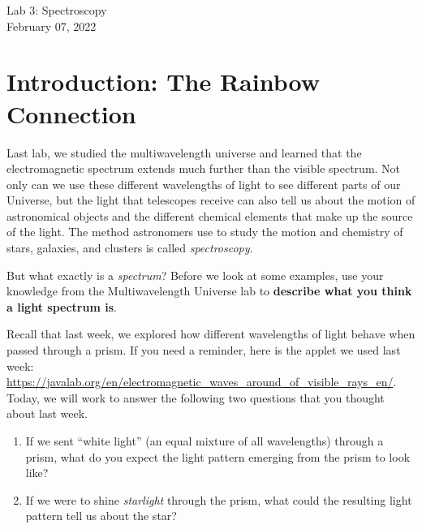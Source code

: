 \documentclass[11pt]{article}
\begin{document}
\begin{center}
\huge{Lab 3: Spectroscopy}\\ \medskip \Large{February 07, 2022}
\end{center}

\section{Introduction: The Rainbow Connection}
Last lab, we studied the multiwavelength universe and learned that the electromagnetic spectrum extends much further than the visible spectrum.  Not only can we use these different wavelengths of light to see different parts of our Universe, but the light that telescopes receive can also tell us about the motion of astronomical objects and the different chemical elements that make up the source of the light.  The method astronomers use to study the motion and chemistry of stars, galaxies, and clusters is called \textit{spectroscopy}.

\medskip \noindent
But what exactly is a \textit{spectrum}?  Before we look at some examples, use your knowledge from the Multiwavelength Universe lab to \textbf{describe what you think a light spectrum is}.

\medskip \noindent
Recall that last week, we explored how different wavelengths of light behave when passed through a prism. If you need a reminder, here is the applet we used last week: \url{https://javalab.org/en/electromagnetic_waves_around_of_visible_rays_en/}.  Today, we will work to answer the following two questions that you thought about last week.

    \begin{enumerate}
        \item If we sent ``white light'' (an equal mixture of all wavelengths) through a prism, what do you expect the light pattern emerging from the prism to look like? 
        
        \item If we were to shine \emph{starlight} through the prism, what could the resulting light pattern tell us about the star?
        
    \end{enumerate}

\end{document}
